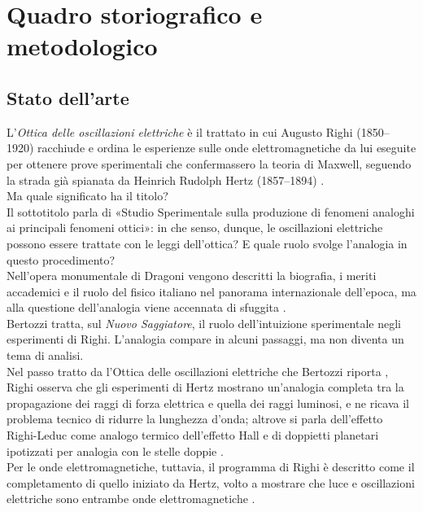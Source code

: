 \chapter{Quadro storiografico e metodologico}


\section{Stato dell'arte}
\label{sec:stato_arte}

L'\textit{Ottica delle oscillazioni elettriche} \cite{righi1897ottica} è il trattato in cui Augusto Righi (1850--1920)
racchiude e ordina le esperienze sulle onde elettromagnetiche da lui eseguite per ottenere prove sperimentali che confermassero
la teoria di Maxwell, seguendo la strada già spianata da Heinrich Rudolph Hertz (1857--1894) \cite{hertz1893electric}.\\
Ma quale significato ha il titolo?\\
Il sottotitolo parla di «Studio Sperimentale sulla produzione di fenomeni analoghi ai principali fenomeni ottici»: in che senso, dunque, 
le oscillazioni elettriche possono essere trattate con le leggi dell'ottica? E quale ruolo svolge l'analogia in questo procedimento?\\
Nell'opera monumentale di Dragoni \cite{dragonirighi2023} vengono descritti la biografia, i meriti accademici e il ruolo del fisico italiano
nel panorama internazionale dell'epoca, ma alla questione dell'analogia viene accennata di sfuggita \cite[p.~160]{dragonirighi2023} 
\cite[p.~234--235]{dragonirighi2023}.\\
Bertozzi \cite{bertozzi2020augusto} tratta, sul \textit{Nuovo Saggiatore}, il ruolo dell'intuizione sperimentale negli esperimenti di Righi.
L'analogia compare in alcuni passaggi, ma non diventa un tema di analisi.\\ 
Nel passo tratto da l'Ottica delle oscillazioni elettriche che Bertozzi riporta \cite[p.~55]{bertozzi2020augusto}, Righi osserva che gli esperimenti di Hertz mostrano un'analogia completa 
tra la propagazione dei raggi di forza elettrica e quella dei raggi luminosi, e ne ricava il problema tecnico di
ridurre la lunghezza d'onda; altrove si parla dell'effetto Righi-Leduc come analogo termico dell'effetto Hall
\cite[p.~55]{bertozzi2020augusto} e di doppietti planetari ipotizzati per analogia con le stelle doppie \cite[p.~60]{bertozzi2020augusto}.\\
Per le onde elettromagnetiche, tuttavia, il programma di Righi è descritto come il completamento di quello iniziato da Hertz, volto a mostrare che luce
e oscillazioni elettriche sono entrambe onde elettromagnetiche \cite[pp.~56 e~62]{bertozzi2020augusto}.

